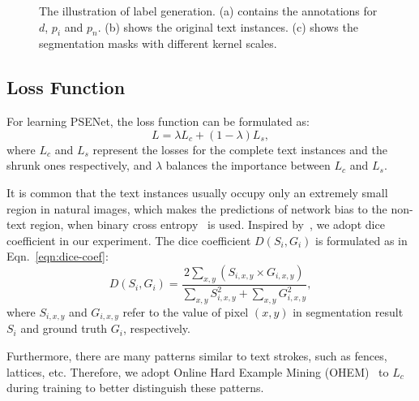 \documentclass[10pt,twocolumn,letterpaper]{article}
\begin{document}
	
	\begin{figure}[t]
		\centering
		\setlength{\fboxrule}{0pt}
		\caption{The illustration of label generation. (a) contains the annotations for $d$, $p_i$ and $p_n$. (b) shows the original text instances. (c) shows the segmentation masks with different kernel scales.}
		\label{fig:label_gen}
		
	\end{figure}
	
	\subsection{Loss Function}
	For learning PSENet, the loss function can be formulated as:
	\begin{equation}
	L =  \lambda L_c + (1 - \lambda) L_s,
	\label{eqn:loss-tot}
	\end{equation}
	where $L_c$ and $L_s$ represent the losses for the complete text instances and the shrunk ones respectively, and $\lambda$ balances the importance between $L_c$ and $L_s$. 
	
	It is common that the text instances usually occupy only an extremely small region in natural images, which makes the predictions of network bias to the non-text region, when binary cross entropy~\cite{de2005tutorial} is used. Inspired by~\cite{milletari2016v}, we adopt dice coefficient in our experiment. The dice coefficient $D(S_i, G_i)$ is formulated as in Eqn.~\eqref{eqn:dice-coef}:
	\begin{equation}
	D(S_i, G_i) = \frac{2 \sum\nolimits_{x,y} (S_{i, x, y} \times G_{i, x, y})}{\sum\nolimits_{x, y} S_{i, x, y}^2 + \sum\nolimits_{x, y} G_{i, x, y}^2},
	\label{eqn:dice-coef}
	\end{equation}
	where $S_{i, x, y}$ and $G_{i, x, y}$ refer to the value of pixel $(x, y)$ in segmentation result $S_i$ and ground truth $G_i$, respectively. 
	
	Furthermore, there are many patterns similar to text strokes, such as fences, lattices, etc. Therefore, we adopt Online Hard Example Mining (OHEM)~\cite{shrivastava2016training} to $L_c$ during training to better distinguish these patterns.
	
\end{document}
